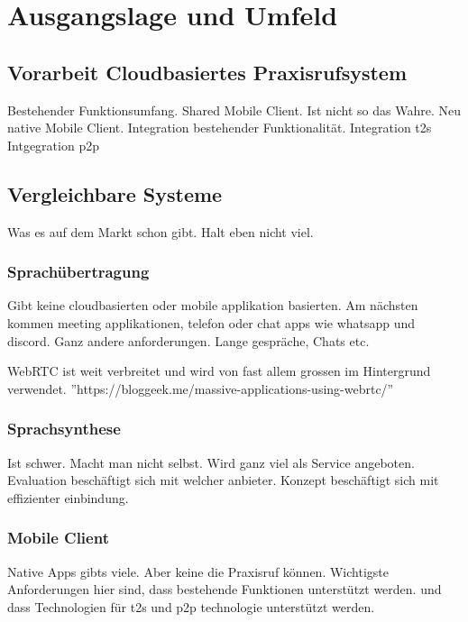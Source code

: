 \section{Ausgangslage und Umfeld}

\subsection{Vorarbeit Cloudbasiertes Praxisrufsystem}

Bestehender Funktionsumfang.
Shared Mobile Client.
Ist nicht so das Wahre.
Neu native Mobile Client.
Integration bestehender Funktionalität.
Integration t2s
Intgegration p2p

\subsection{Vergleichbare Systeme}

Was es auf dem Markt schon gibt.
Halt eben nicht viel.

\subsubsection{Sprachübertragung}

Gibt keine cloudbasierten oder mobile applikation basierten.
Am nächsten kommen meeting applikationen, telefon oder chat apps wie whatsapp und discord.
Ganz andere anforderungen.
Lange gespräche, Chats etc.

WebRTC ist weit verbreitet und wird von fast allem grossen im Hintergrund verwendet.
''https://bloggeek.me/massive-applications-using-webrtc/''

\subsubsection{Sprachsynthese}
Ist schwer.
Macht man nicht selbst.
Wird ganz viel als Service angeboten.
Evaluation beschäftigt sich mit welcher anbieter.
Konzept beschäftigt sich mit effizienter einbindung.

\subsubsection{Mobile Client}
Native Apps gibts viele.
Aber keine die Praxisruf können.
Wichtigste Anforderungen hier sind, dass bestehende Funktionen unterstützt werden.
und dass Technologien für t2s und p2p technologie unterstützt werden.

\clearpage

